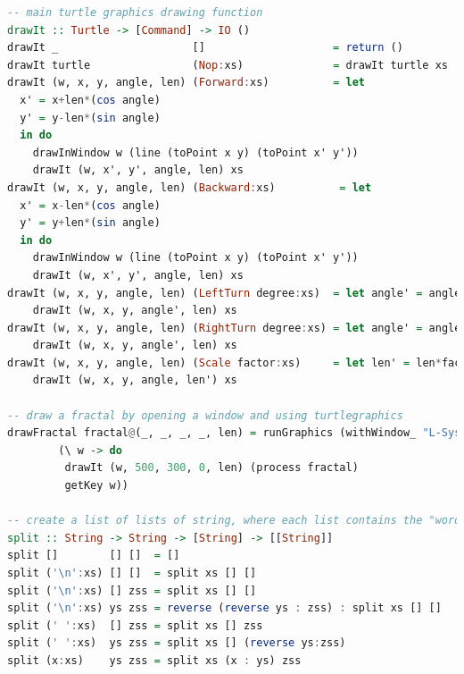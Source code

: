 \documentclass{article}
\begin{document}
\begin{lstlisting}[language=Haskell]
-- main turtle graphics drawing function
drawIt :: Turtle -> [Command] -> IO ()
drawIt _                     []                    = return ()
drawIt turtle                (Nop:xs)              = drawIt turtle xs
drawIt (w, x, y, angle, len) (Forward:xs)          = let
  x' = x+len*(cos angle)
  y' = y-len*(sin angle)
  in do
    drawInWindow w (line (toPoint x y) (toPoint x' y'))
    drawIt (w, x', y', angle, len) xs
drawIt (w, x, y, angle, len) (Backward:xs)          = let
  x' = x-len*(cos angle)
  y' = y+len*(sin angle)
  in do
    drawInWindow w (line (toPoint x y) (toPoint x' y'))
    drawIt (w, x', y', angle, len) xs
drawIt (w, x, y, angle, len) (LeftTurn degree:xs)  = let angle' = angle+(fromIntegral degree)*pi/180 in
    drawIt (w, x, y, angle', len) xs
drawIt (w, x, y, angle, len) (RightTurn degree:xs) = let angle' = angle-(fromIntegral degree)*pi/180 in
    drawIt (w, x, y, angle', len) xs
drawIt (w, x, y, angle, len) (Scale factor:xs)     = let len' = len*factor in
    drawIt (w, x, y, angle, len') xs

-- draw a fractal by opening a window and using turtlegraphics
drawFractal fractal@(_, _, _, _, len) = runGraphics (withWindow_ "L-System using Turtle Graphics" (1000, 600)
        (\ w -> do
         drawIt (w, 500, 300, 0, len) (process fractal)
         getKey w))

-- create a list of lists of string, where each list contains the "words" of one line
split :: String -> String -> [String] -> [[String]]
split []        [] []  = []
split ('\n':xs) [] []  = split xs [] []
split ('\n':xs) [] zss = split xs [] []
split ('\n':xs) ys zss = reverse (reverse ys : zss) : split xs [] []
split (' ':xs)  [] zss = split xs [] zss
split (' ':xs)  ys zss = split xs [] (reverse ys:zss)
split (x:xs)    ys zss = split xs (x : ys) zss


\end{lstlisting}
\end{document}
